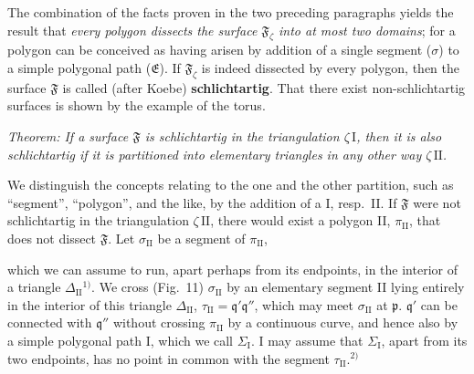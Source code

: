 \documentclass{article}
\begin{document}
The combination of the facts proven in the two preceding paragraphs yields the result that \emph{every polygon dissects the surface $\mathfrak{F}_\zeta$ into at most two domains}; for a polygon can be conceived as having arisen by addition of a single segment ($\sigma$) to a simple polygonal path ($\mathfrak{E}$). If $\mathfrak{F}_\zeta$ is indeed dissected by every polygon, then the surface $\mathfrak{F}$ is called (after Koebe) \textbf{schlichtartig}. That there exist non-schlichtartig surfaces is shown by the example of the torus.

\emph{Theorem: If a surface $\mathfrak{F}$ is schlichtartig in the triangulation $\zeta\,\mathrm{I}$, then it is also schlichtartig if it is partitioned into elementary triangles in any other way $\zeta\,\mathrm{II}$.}

We distinguish the concepts relating to the one and the other partition, such as ``segment'', ``polygon'', and the like, by the addition of a I, resp.\ II. If $\mathfrak{F}$ were not schlichtartig in the triangulation $\zeta\,\mathrm{II}$, there would exist a polygon II, $\pi_{\mathrm{II}}$, that does not dissect $\mathfrak{F}$. Let $\sigma_{\mathrm{II}}$ be a segment of $\pi_{\mathrm{II}}$,

which we can assume to run, apart perhaps from its endpoints, in the interior of a triangle $\Delta_{\mathrm{II}}$${}^{1)}$. We cross (Fig.~11) $\sigma_{\mathrm{II}}$ by an elementary segment II lying entirely in the interior of this triangle $\Delta_{\mathrm{II}}$, $\tau_{\mathrm{II}} = \mathfrak{q}'\mathfrak{q}''$, which may meet $\sigma_{\mathrm{II}}$ at $\mathfrak{p}$. $\mathfrak{q}'$ can be connected with $\mathfrak{q}''$ without crossing $\pi_{\mathrm{II}}$ by a continuous curve, and hence also by a simple polygonal path I, which we call $\varSigma_{\mathrm{I}}$. I may assume that $\varSigma_{\mathrm{I}}$, apart from its two endpoints, has no point in common with the segment $\tau_{\mathrm{II}}$.${}^{2)}$

\end{document}
